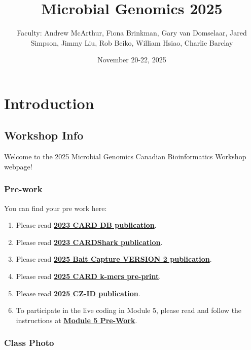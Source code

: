 \documentclass[
]{book}
\title{Microbial Genomics 2025}
\author{Faculty: Andrew McArthur, Fiona Brinkman, Gary van Domselaar, Jared Simpson, Jimmy Liu, Rob Beiko, William Hsiao, Charlie Barclay}
\date{November 20-22, 2025}
\providecommand{\tightlist}{%
  \setlength{\itemsep}{0pt}\setlength{\parskip}{0pt}}
\begin{document}
\maketitle

{
\setcounter{tocdepth}{1}
\tableofcontents
}
\part{Introduction}\label{part-introduction}

\chapter{Workshop Info}\label{workshop-info}

Welcome to the 2025 Microbial Genomics Canadian Bioinformatics Workshop webpage!

\section{Pre-work}\label{pre-work}

You can find your pre work here:

\begin{enumerate}
\def\labelenumi{\arabic{enumi}.}
\tightlist
\item
  Please read \href{./content-files/2023\%20CARD\%20DB\%20publication.pdf}{\textbf{2023 CARD DB publication}}.
\item
  Please read \href{./content-files/2023\%20CARDShark\%20publication.pdf}{\textbf{2023 CARDShark publication}}.
\item
  Please read \href{./content-files/2025\%20Bait\%20Capture\%20VERSION\%202\%20publication\%20(CARPDM).pdf}{\textbf{2025 Bait Capture VERSION 2 publication}}.
\item
  Please read \href{./content-files/2025\%20CARD\%20k-mers\%20pre-print.pdf}{\textbf{2025 CARD k-mers pre-print}}.
\item
  Please read \href{./content-files/2025\%20CZ-ID\%20publication.pdf}{\textbf{2025 CZ-ID publication}}.
\item
  To participate in the live coding in Module 5, please read and follow the instructions at \href{./content-files/Module\%205\%20pre-work.md}{\textbf{Module 5 Pre-Work}}.
\end{enumerate}

\section{Class Photo}\label{class-photo}
\end{document}
